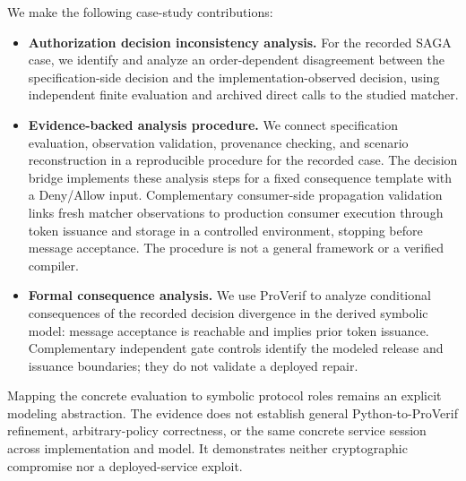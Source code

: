We make the following case-study contributions:
\begin{itemize}
  \item \textbf{Authorization decision inconsistency analysis.}
    For the recorded SAGA case, we identify and analyze an order-dependent
    disagreement between the specification-side decision and the
    implementation-observed decision, using independent finite evaluation
    and archived direct calls to the studied matcher.
  \item \textbf{Evidence-backed analysis procedure.}
    We connect specification evaluation, observation validation, provenance
    checking, and scenario reconstruction in a reproducible procedure for
    the recorded case. The decision bridge implements these analysis steps
    for a fixed consequence template with a Deny/Allow input. Complementary consumer-side
    propagation validation links fresh matcher observations to production
    consumer execution through token issuance and storage in a controlled
    environment, stopping before message acceptance. The procedure is not
    a general framework or a verified compiler.
  \item \textbf{Formal consequence analysis.}
    We use ProVerif to analyze conditional consequences of the recorded
    decision divergence in the derived symbolic model: message acceptance
    is reachable and implies prior token issuance. Complementary independent
    gate controls identify the modeled release and issuance boundaries;
    they do not validate a deployed repair.
\end{itemize}

Mapping the concrete evaluation to symbolic protocol roles remains an explicit
modeling abstraction. The evidence does not establish general Python-to-ProVerif
refinement, arbitrary-policy correctness, or the same concrete service session
across implementation and model. It demonstrates neither cryptographic
compromise nor a deployed-service exploit.

